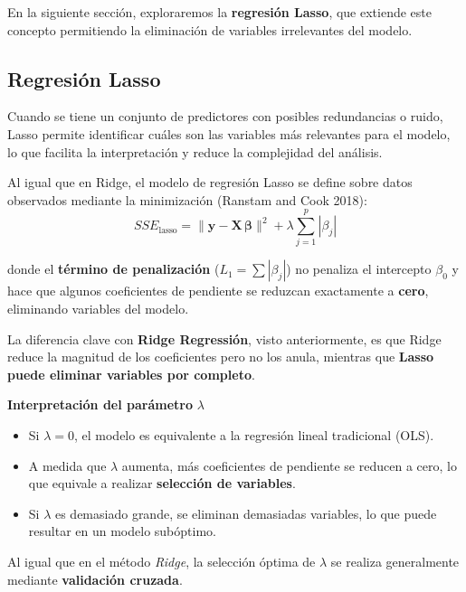 \documentclass[
  letterpaper,
  DIV=11,
  numbers=noendperiod]{scrreprt}
\providecommand{\tightlist}{%
  \setlength{\itemsep}{0pt}\setlength{\parskip}{0pt}}
\begin{document}
En la siguiente sección, exploraremos la \textbf{regresión Lasso}, que
extiende este concepto permitiendo la eliminación de variables
irrelevantes del modelo.

\subsection{Regresión Lasso}\label{regresiuxf3n-lasso}

Cuando se tiene un conjunto de predictores con posibles redundancias o
ruido, Lasso permite identificar cuáles son las variables más relevantes
para el modelo, lo que facilita la interpretación y reduce la
complejidad del análisis.

Al igual que en Ridge, el modelo de regresión Lasso se define sobre
datos observados mediante la minimización (Ranstam and Cook 2018): \[
SSE_{\text{lasso}} = \| \mathbf{y} - \mathbf{X} \, \boldsymbol{\beta} \|^2 + \lambda \sum_{j=1}^{p} |\beta_j|
\]

donde el \textbf{término de penalización} (\(L_1=\sum |\beta_j|\)) no
penaliza el intercepto \(\beta_0\) y hace que algunos coeficientes de
pendiente se reduzcan exactamente a \textbf{cero}, eliminando variables
del modelo.

La diferencia clave con \textbf{Ridge Regressión}, visto anteriormente,
es que Ridge reduce la magnitud de los coeficientes pero no los anula,
mientras que \textbf{Lasso puede eliminar variables por completo}.

\textbf{Interpretación del parámetro} \(\lambda\)

\begin{itemize}
\tightlist
\item
  Si \(\lambda = 0\), el modelo es equivalente a la regresión lineal
  tradicional (OLS).
\item
  A medida que \(\lambda\) aumenta, más coeficientes de pendiente se
  reducen a cero, lo que equivale a realizar \textbf{selección de
  variables}.
\item
  Si \(\lambda\) es demasiado grande, se eliminan demasiadas variables,
  lo que puede resultar en un modelo subóptimo.
\end{itemize}

Al igual que en el método \emph{Ridge}, la selección óptima de
\(\lambda\) se realiza generalmente mediante \textbf{validación
cruzada}.
\end{document}
